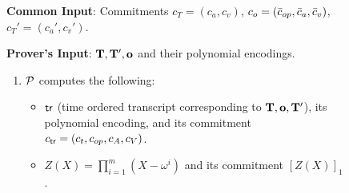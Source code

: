 \begin{figure}[htbp]

    \begin{mdframed}
    {
            {\bf Common Input}: Commitments $c_T=(c_a,c_v)$, $c_o=(\bar{c}_{op}, \bar{c}_a, \bar{c}_v)$, $c_T'=(c_a', c_v')$.

            {\bf Prover's Input}: $ \mathbf{T}, \mathbf{T}', \mathbf{o}$ and their polynomial encodings.
        \begin{enumerate}[leftmargin=1em, label=\arabic*.]
            \item $\mathcal{P}$ computes the following:
            \begin{itemize}
                \item $\mathsf{tr}$ (time ordered transcript corresponding to $\mathbf{T}, \mathbf{o}, \mathbf{T}'$), its polynomial encoding, and its commitment $c_{\mathsf{tr}}=(c_t, c_{op}, c_A, c_V)$.
                \item $Z(X)=\prod_{i=1}^m (X-\omega^i)$ and its commitment $[Z(X)]_1$.
            \end{itemize}


\end{enumerate}}
\end{mdframed}
\end{figure}
